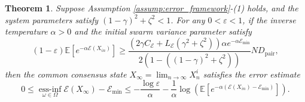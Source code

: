 \documentclass[12pt]{amsart}
\newenvironment{thisnote}{\par\color{blue}}{\par}
\DeclareMathOperator*{\essinf}{ess-inf}
\numberwithin{equation}{section}
\newtheorem{theorem}{Theorem}[section]
\begin{document}

     \begin{theorem}\label{thm:discrete_error}
Suppose Assumption \ref{assump:error_framework}-(1) holds, and the system parameters satisfy $(1-\gamma)^2 + \zeta^2 < 1$. For any $0 < \varepsilon < 1$, if the inverse temperature $\alpha > 0$ and the initial swarm variance parameter satisfy
\begin{equation}\label{eq:initial_condition_B}
    (1-\varepsilon)\mathbb{E}[e^{-\alpha \mathscr{E}(X_{in})}] \ge \frac{ \left( 2\gamma C_{\mathscr{E}} + L_\mathscr{E}(\gamma^2 + \zeta^2) \right) \alpha e^{-\alpha \mathscr{E}_{\min}}}{2(1 - ((1-\gamma)^2 + \zeta^2))} N D_{\text{pair}},
\end{equation}
then the common consensus state $X_\infty = \lim_{n \to \infty} X_n^i$ satisfies the error estimate
\begin{equation*}
    0 \le \essinf\limits_{\omega \in \Omega} \mathscr{E}(X_\infty) - \mathscr{E}_{\min} \le - \frac{\log \varepsilon}{\alpha} - \frac{1}{\alpha} \log \left( \mathbb{E}[e^{-\alpha (\mathscr{E}(X_{in}) - \mathscr{E}_{\min})}] \right).
\end{equation*}
\end{theorem}
\end{document}
